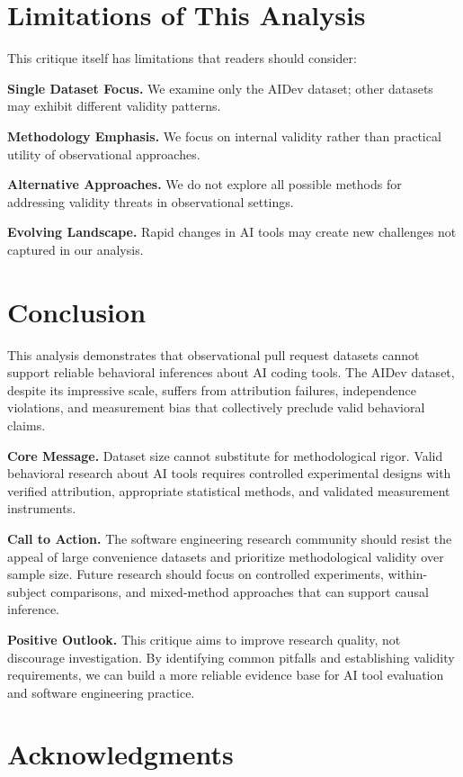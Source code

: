 \documentclass[conference]{IEEEtran}
\begin{document}
\section{Limitations of This Analysis}

This critique itself has limitations that readers should consider:

\textbf{Single Dataset Focus.} We examine only the AIDev dataset; other datasets may exhibit different validity patterns.

\textbf{Methodology Emphasis.} We focus on internal validity rather than practical utility of observational approaches.

\textbf{Alternative Approaches.} We do not explore all possible methods for addressing validity threats in observational settings.

\textbf{Evolving Landscape.} Rapid changes in AI tools may create new challenges not captured in our analysis.

\section{Conclusion}

This analysis demonstrates that observational pull request datasets cannot support reliable behavioral inferences about AI coding tools. The AIDev dataset, despite its impressive scale, suffers from attribution failures, independence violations, and measurement bias that collectively preclude valid behavioral claims.

\textbf{Core Message.} Dataset size cannot substitute for methodological rigor. Valid behavioral research about AI tools requires controlled experimental designs with verified attribution, appropriate statistical methods, and validated measurement instruments.

\textbf{Call to Action.} The software engineering research community should resist the appeal of large convenience datasets and prioritize methodological validity over sample size. Future research should focus on controlled experiments, within-subject comparisons, and mixed-method approaches that can support causal inference.

\textbf{Positive Outlook.} This critique aims to improve research quality, not discourage investigation. By identifying common pitfalls and establishing validity requirements, we can build a more reliable evidence base for AI tool evaluation and software engineering practice.

\section*{Acknowledgments}
\end{document}
